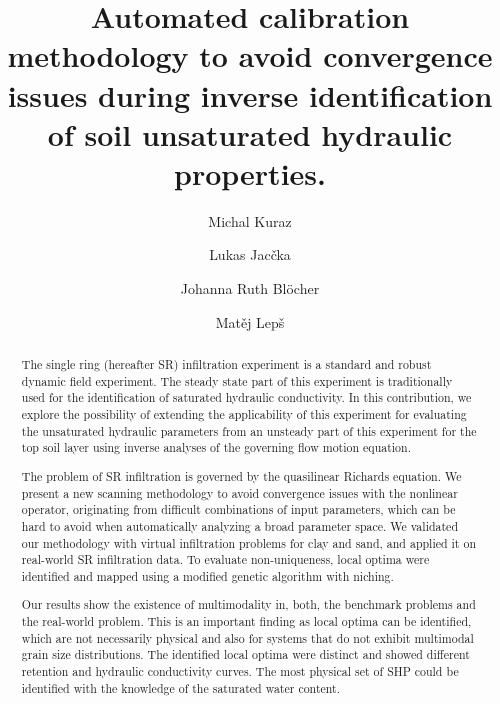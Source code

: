 \documentclass[review,times,3p,10pt]{elsarticle}
\begin{document}
\begin{frontmatter}



\title{Automated calibration methodology to avoid convergence issues during inverse identification of soil unsaturated hydraulic properties.}

\author[autor1]{Michal Kuraz}

\author[autor1]{Lukas Jac\v{c}ka}

\author[autor1]{Johanna Ruth Bl\"ocher}

\author[autor2]{Mat\v{e}j Lep\v{s}}



\address[autor1]{Czech University of Life Sciences Prague, Faculty of Environmental Sciences, Department of Water Resources and Environmental Modeling}

\address[autor2]{Czech Technical University in Prague, Faculty of Civil Engineering, Department of Mechanics}

\begin{abstract}
The single ring (hereafter SR) infiltration experiment is a standard and robust dynamic field experiment. The steady state part of this experiment is traditionally used for the identification of saturated hydraulic conductivity. In this contribution, we explore the possibility of extending the applicability of this experiment for evaluating the unsaturated hydraulic parameters from an unsteady part of this experiment for the top soil layer using inverse analyses of the governing flow motion equation.

The problem of SR infiltration is governed by the quasilinear Richards equation. We present a new scanning methodology to avoid convergence issues with the nonlinear operator, originating from difficult combinations of input parameters, which can be hard to avoid when automatically analyzing a broad parameter space. We validated our methodology with virtual infiltration problems for clay and sand, and applied it on real-world SR infiltration data. To evaluate non-uniqueness, local optima were identified and mapped using a modified genetic algorithm with niching.

Our results show the existence of multimodality in, both, the benchmark problems and the real-world problem. This is an important finding as local optima can be identified, which are not necessarily physical and also for systems that do not exhibit multimodal grain size distributions. The identified local optima were distinct and showed different retention and hydraulic conductivity curves. The most physical set of SHP could be identified with the knowledge of the saturated water content. 





\end{abstract}
\end{frontmatter}
\end{document}
